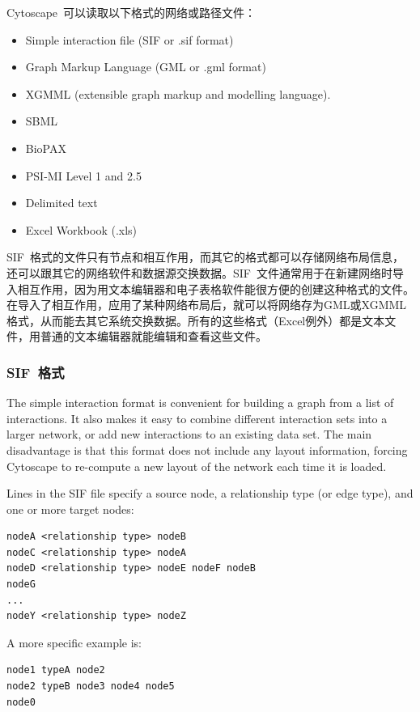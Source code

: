 Cytoscape~可以读取以下格式的网络或路径文件：
\begin{itemize}
\item Simple interaction file (SIF or .sif format) 
\item Graph Markup Language (GML or .gml format) 
\item XGMML (extensible graph markup and modelling language). 
\item SBML 
\item BioPAX 
\item PSI-MI Level 1 and 2.5 
\item Delimited text 
\item Excel Workbook (.xls) 
\end{itemize}

SIF~格式的文件只有节点和相互作用，而其它的格式都可以存储网络布局信息，还可以跟其它的网络软件和数据源交换数据。SIF~文件通常用于在新建网络时导入相互作用，因为用文本编辑器和电子表格软件能很方便的创建这种格式的文件。在导入了相互作用，应用了某种网络布局后，就可以将网络存为GML或XGMML格式，从而能去其它系统交换数据。所有的这些格式（Excel例外）都是文本文件，用普通的文本编辑器就能编辑和查看这些文件。


 \subsubsection{SIF~格式}
 The simple interaction format is convenient for building a graph from a list of interactions. It also makes it easy to combine different interaction sets into a larger network, or add new interactions to an existing data set. The main disadvantage is that this format does not include any layout information, forcing Cytoscape to re-compute a new layout of the network each time it is loaded. 

 Lines in the SIF file specify a source node, a relationship type (or edge type), and one or more target nodes: 

 \begin{verbatim}
nodeA <relationship type> nodeB
nodeC <relationship type> nodeA
nodeD <relationship type> nodeE nodeF nodeB
nodeG
...
nodeY <relationship type> nodeZ

\end{verbatim}



 A more specific example is: 


 \begin{verbatim}
node1 typeA node2
node2 typeB node3 node4 node5
node0

\end{verbatim}




